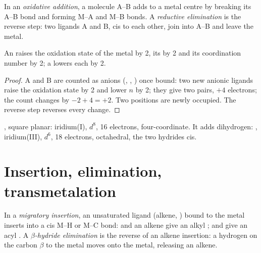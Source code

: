 \begin{definition}\label{def:b2:catalytic-cycles:oxidative-addition}
In an \emph{oxidative addition}, a molecule A--B adds to a
metal centre by breaking its A--B bond and forming M--A and M--B bonds. A
\emph{reductive elimination} is the reverse step: two
ligands A and B, cis to each other, join into A--B and leave the metal.
\end{definition}

\begin{proposition}\label{prop:b2:catalytic-cycles:oa}
An  raises the oxidation state of the metal by 2, its  by 2 and its coordination number by 2; a  lowers each by 2.
\end{proposition}

\begin{proof}
A and B are counted as anions (, , ) once bound: two new anionic
ligands raise the oxidation state by 2 and lower $n$ by 2; they give two pairs, $+4$
electrons; the count changes by $-2 + 4 = +2$. Two positions are newly occupied. The
reverse step reverses every change.
\end{proof}

\begin{example}\label{ex:b2:catalytic-cycles:vaska}
, square planar: iridium(I), $d^8$, 16 electrons, four-coordinate.
It adds dihydrogen: , iridium(III), $d^6$, 18 electrons, octahedral,
the two hydrides cis.
\end{example}

\section{Insertion, elimination, transmetalation}

\begin{definition}\label{def:b2:catalytic-cycles:insertion}
In a \emph{migratory insertion}, an unsaturated ligand
(alkene, ) bound to the metal inserts into a cis M--H or M--C bond:  and an
alkene give an alkyl ;  and  give an acyl .
A \emph{$\beta$-hydride elimination} is the reverse of an alkene insertion: a hydrogen on the carbon $\beta$ to the
metal moves onto the metal, releasing an alkene.
\end{definition}

